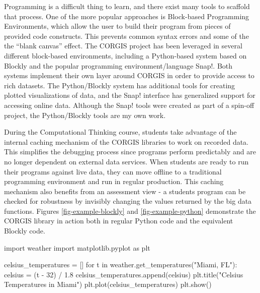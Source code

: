 Programming is a difficult thing to learn, and there exist many tools to scaffold that process.
One of the more popular approaches is Block-based Programming Environments, which allow the user to build their program from pieces of provided code constructs.
This prevents common syntax errors and some of the the ``blank canvas'' effect.
The CORGIS project has been leveraged in several different block-based environments, including a Python-based system based on Blockly and the popular programming environment/language Snap!. 
Both systems implement their own layer around CORGIS in order to provide access to rich datasets.
The Python/Blockly system has additional tools for creating plotted visualizations of data, and the Snap! interface has generalized support for accessing online data.
Although the Snap! tools were created as part of a spin-off project, the Python/Blockly tools are my own work.

During the Computational Thinking course, students take advantage of the internal caching mechanism of the CORGIS libraries to work on recorded data.
This simplifies the debugging process since programs perform predictably and are no longer dependent on external data services.
When students are ready to run their programs against live data, they can move offline to a traditional programming environment and run in regular production.
This caching mechanism also benefits from an assessment view - a students program can be checked for robustness by invisibly changing the values returned by the big data functions.
Figures \ref{fig-example-blockly} and \ref{fig-example-python} demonstrate the CORGIS library in action both in regular Python code and the equivalent Blockly code.

\begin{figure*}[hb]
\centering
\begin{minipage}[b]{.75\linewidth}
\caption{Blockly Code}
\label{fig-example-blockly}
\end{minipage}

\smallskip

\begin{minipage}[b]{.75\linewidth}
\caption{Python Code}
\label{fig-example-python}
\begin{python}
import weather
import matplotlib.pyplot as plt

celsius_temperatures = []
for t in weather.get_temperatures("Miami, FL"):
	celsius = (t - 32) / 1.8
	celsius_temperatures.append(celsius)
plt.title("Celsius Temperatures in Miami")
plt.plot(celsius_temperatures)
plt.show()
\end{python}
\end{minipage}
\end{figure*}


